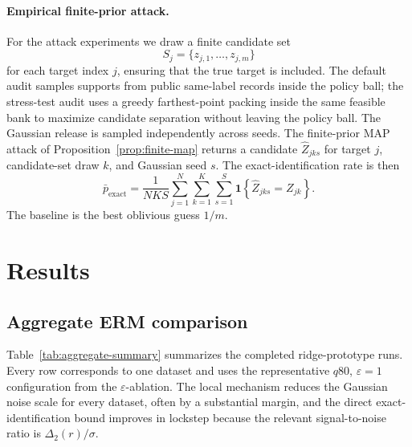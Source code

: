 \documentclass[conference,compsoc]{IEEEtran}
\newcommand{\ind}[1]{\mathbf{1}\!\left\{#1\right\}}
\begin{document}
\paragraph{Empirical finite-prior attack.}
For the attack experiments we draw a finite candidate set
\[
S_j=\{z_{j,1},\dots,z_{j,m}\}
\]
for each target index $j$, ensuring that the true target is included. The default audit samples supports from public same-label records inside the policy ball; the stress-test audit uses a greedy farthest-point packing inside the same feasible bank to maximize candidate separation without leaving the policy ball. The Gaussian release is sampled independently across seeds. The finite-prior MAP attack of Proposition~\ref{prop:finite-map} returns a candidate $\widehat Z_{jks}$ for target $j$, candidate-set draw $k$, and Gaussian seed $s$. The exact-identification rate is then
\[
\bar p_{\mathrm{exact}}
=
\frac{1}{NKS}\sum_{j=1}^{N}\sum_{k=1}^{K}\sum_{s=1}^{S}
\ind{\widehat Z_{jks}=Z_{jk}}.
\]
The baseline is the best oblivious guess $1/m$.

\section{Results}
\label{sec:results}

\subsection{Aggregate ERM comparison}
Table~\ref{tab:aggregate-summary} summarizes the completed ridge-prototype runs. Every row corresponds to one dataset and uses the representative $q80$, $\varepsilon=1$ configuration from the $\varepsilon$-ablation. The local mechanism reduces the Gaussian noise scale for every dataset, often by a substantial margin, and the direct exact-identification bound improves in lockstep because the relevant signal-to-noise ratio is $\Delta_2(r)/\sigma$.
\end{document}
